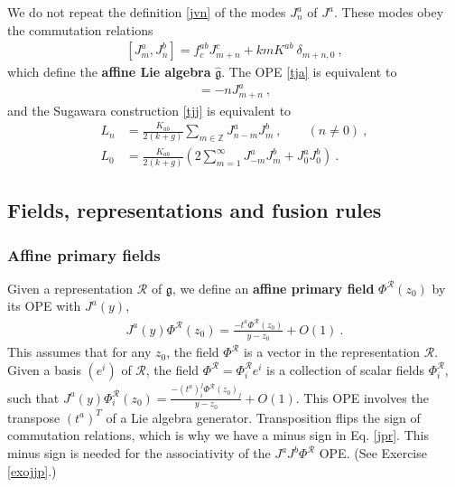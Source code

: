 \documentclass[12pt, a4paper, notitlepage, twoside]{report}
\numberwithin{equation}{section}
\theoremstyle{break}
\begin{document}
We do not repeat the definition \eqref{jvn} of the modes $J^a_n$ of $J^a$.
These modes obey the commutation relations
\begin{align}
 \boxed{[J^a_m,J^b_n] =   f^{ab}_c J^c_{m+n} +kmK^{ab}\ \delta_{m+n,0}} \ , 
\label{jam}
\end{align}
which define the \textbf{\boldmath affine Lie algebra} $\hat{\mathfrak{g}}$. 
The OPE \eqref{tja} is equivalent to
\begin{align}
 [L_m,J^a_n] = -nJ^a_{m+n}\ ,
\end{align}
and the Sugawara construction \eqref{tjj} is equivalent to 
\begin{align}
 L_n &= \frac{K_{ab}}{2(k+g)} \sum_{m\in{\mathbb{Z}}} J^a_{n-m}J^b_m\ , \qquad (n\neq 0)\ ,
\label{ljj}
\\
L_0 & = \frac{K_{ab}}{2(k+g)}\left(2\sum_{m=1}^\infty J^a_{-m}J^b_m + J^a_0J^b_0\right)\ .
\label{lzjj}
\end{align}

\subsection{Fields, representations and fusion rules}
 
\subsubsection{Affine primary fields} 
 
Given a representation $\mathcal{R}$ of $\mathfrak{g}$, we define an \textbf{\boldmath affine primary field} $\Phi^{\mathcal{R}}(z_0)$ by its OPE with $J^a(y)$,
\begin{align}
 \boxed{ J^a(y) \Phi^{\mathcal{R}}(z_0) = \frac{-t^a\Phi^{\mathcal{R}}(z_0)}{y-z_0} + O(1) } \ .
\label{jpr}
\end{align}
This assumes that for any $z_0$, the field $\Phi^{\mathcal{R}}$ is a vector in the representation $\mathcal{R}$. Given a basis $(e^i)$ of $\mathcal{R}$, the field $\Phi^{\mathcal{R}} = \Phi^{\mathcal{R}}_ie^i$ is a collection of scalar fields $\Phi^{\mathcal{R}}_i$, such that $J^a(y)\Phi^{\mathcal{R}}_i(z_0) = \frac{-(t^a)^j_i\Phi^{\mathcal{R}}(z_0)_j}{y-z_0}+O(1)$. This OPE involves the transpose $(t^a)^T$ of a Lie algebra generator. Transposition flips the sign of commutation relations, which is why we have a minus sign in Eq. \eqref{jpr}. This minus sign is needed for 
the associativity of the $J^aJ^b\Phi^\mathcal{R}$ OPE. (See Exercise \ref{exojjp}.)
\end{document}
